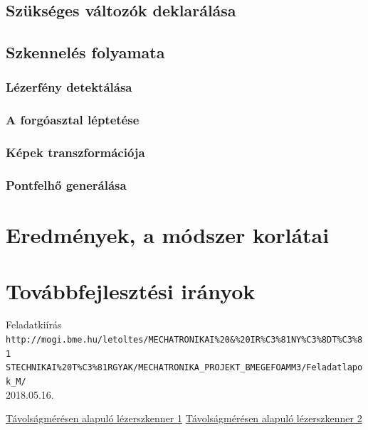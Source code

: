 \documentclass[12pt,a4paper]{article}
\begin{document}
\subsection{Szükséges változók deklarálása}
\subsection{Szkennelés folyamata}
\subsubsection{Lézerfény detektálása}
\subsubsection{A forgóasztal léptetése}
\subsubsection{Képek transzformációja}
\subsubsection{Pontfelhő generálása}
\section{Eredmények, a módszer korlátai}
\section{Továbbfejlesztési irányok}
\newpage
\begin{thebibliography}{9} 
Feladatkiírás\\
\texttt{http://mogi.bme.hu/letoltes/MECHATRONIKAI\%20\&\%20IR\%C3\%81NY\%C3\%8DT\%C3\%81\\
STECHNIKAI\%20T\%C3\%81RGYAK/MECHATRONIKA\_PROJEKT\_BMEGEFOAMM3/Feladatlapok\_M/}\\
2018.05.16.


\href{http://lanmarservices.com/wp-content/uploads/2014/04/Faro_Building_Scan.jpg}{Távolságmérésen alapuló lézerszkenner 1}
\href{https://i1.wp.com/cmfenews.com/wp-content/uploads/2018/04/3D-Laser.jpg?fit=1600%2C1200&ssl=1}{Távolságmérésen alapuló lézerszkenner 2}

\end{thebibliography}
\end{document}
